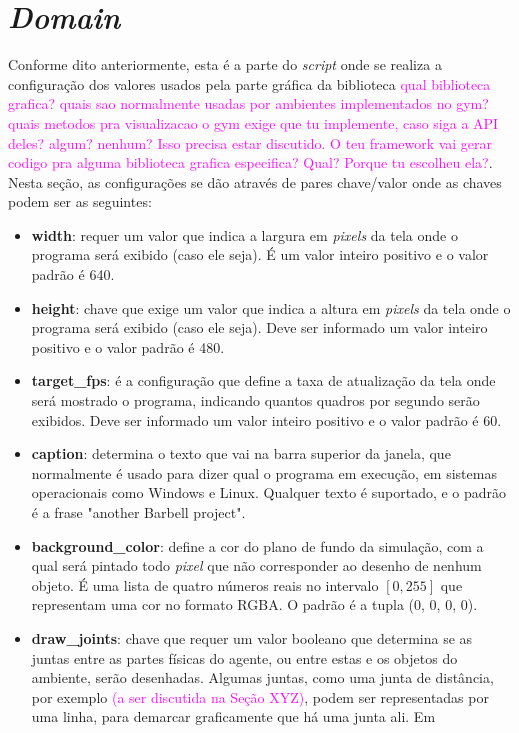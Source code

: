 \documentclass[cic,tc]{iiufrgs}
\newcommand\bruno[1]{\textcolor{magenta}{#1}}
\begin{document}
\section{\textit{Domain}}
Conforme dito anteriormente, esta é a parte do \textit{script} onde se realiza a configuração dos valores usados
pela parte gráfica da biblioteca \bruno{qual biblioteca grafica? quais sao normalmente usadas por ambientes implementados no gym? quais metodos pra visualizacao o gym exige que tu implemente, caso siga a API deles? algum? nenhum? Isso precisa estar discutido. O teu framework vai gerar codigo pra alguma biblioteca grafica especifica? Qual? Porque tu escolheu ela?}. Nesta seção, as configurações se dão através de pares chave/valor onde as chaves podem ser as seguintes:
\begin{itemize}
  \item \textbf{width}: requer um valor que indica a largura em \textit{pixels} da tela onde o programa será exibido (caso ele seja). É um valor
  inteiro positivo e o valor padrão é 640.
  \item \textbf{height}: chave que exige um valor que indica a altura em \textit{pixels} da tela onde o programa será exibido (caso ele seja). Deve ser informado
  um valor inteiro positivo e o valor padrão é 480.
  \item \textbf{target\_fps}: é a configuração que define a taxa de atualização da tela onde será mostrado o programa, indicando quantos quadros
  por segundo serão exibidos. Deve ser informado um valor inteiro positivo e o valor padrão é 60.
  \item \textbf{caption}: determina o texto que vai na barra superior da janela, que normalmente é usado para dizer qual o programa em execução,
  em sistemas operacionais como Windows e Linux. Qualquer texto é suportado, e o padrão é a frase "another Barbell project".
  \item \textbf{background\_color}: define a cor do plano de fundo da simulação, com a qual será pintado todo \textit{pixel} que não corresponder
  ao desenho de nenhum objeto. É uma lista de quatro números reais no intervalo $[0, 255]$ que representam uma cor no formato RGBA. O padrão é a tupla (0, 0, 0, 0).
  \item \textbf{draw\_joints}: chave que requer um valor booleano que determina se as juntas entre as partes físicas do agente, ou entre estas e os objetos do ambiente, serão desenhadas. Algumas juntas, como uma junta de distância, por exemplo \bruno{(a ser discutida na Seção XYZ)}, podem ser representadas por uma linha, para demarcar graficamente que há uma junta ali. Em

\end{itemize}
\end{document}
